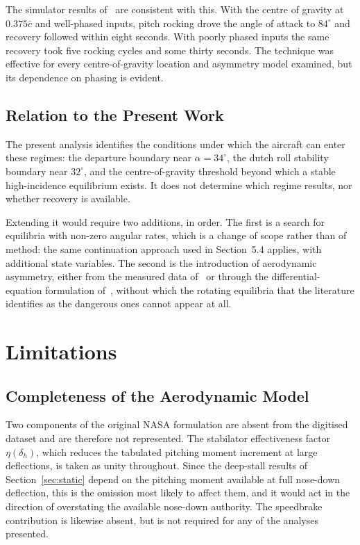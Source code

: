 \documentclass[
bindingoffset=5mm,  %
footnoteindent=3mm, %
hyphenation=true    %
]{src/wut-thesis}
\begin{document}
 The simulator results of~\cite{nguyen1979} are consistent with this. With the
 centre of gravity at $0.375\bar{c}$ and well-phased inputs, pitch rocking drove
 the angle of attack to $84^{\circ}$ and recovery followed within eight seconds.
 With poorly phased inputs the same recovery took five rocking cycles and some
 thirty seconds. The technique was effective for every centre-of-gravity
 location and asymmetry model examined, but its dependence on phasing is
 evident.
 
 \subsection{Relation to the Present Work}
 
 The present analysis identifies the conditions under which the aircraft can
 enter these regimes: the departure boundary near $\alpha = 34^{\circ}$, the
 dutch roll stability boundary near $32^{\circ}$, and the centre-of-gravity
 threshold beyond which a stable high-incidence equilibrium exists. It does not
 determine which regime results, nor whether recovery is available.
 
 Extending it would require two additions, in order. The first is a search for
 equilibria with non-zero angular rates, which is a change of scope rather than
 of method: the same continuation approach used in Section~5.4 applies, with
 additional state variables. The second is the introduction of aerodynamic
 asymmetry, either from the measured data of~\cite{nguyen1979} or through the
 differential-equation formulation of~\cite{goman2003}, without which the
 rotating equilibria that the literature identifies as the dangerous ones
 cannot appear at all.
 
 
 \section{Limitations}
 \label{sec:limitations}
 
 \subsection{Completeness of the Aerodynamic Model}
 
 Two components of the original NASA formulation are absent from the digitised
 dataset and are therefore not represented. The stabilator effectiveness factor
 $\eta(\delta_{h})$, which reduces the tabulated pitching moment increment at
 large deflections, is taken as unity throughout. Since the deep-stall results
 of Section~\ref{sec:static} depend on the pitching moment available at full
 nose-down deflection, this is the omission most likely to affect them, and it
 would act in the direction of overstating the available nose-down authority.
 The speedbrake contribution is likewise absent, but is not required for any of
 the analyses presented.
 
\end{document}
